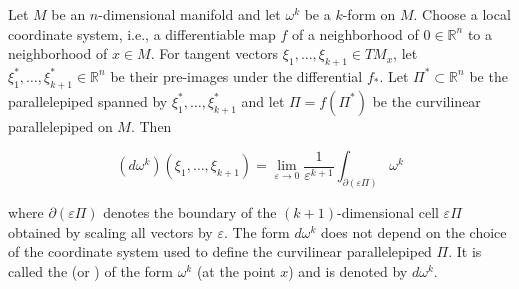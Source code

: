 Let $M$ be an $n$-dimensional manifold and let $\omega^k$ be a $k$-form on $M$. Choose a local coordinate system, i.e., a differentiable map $f$ of a neighborhood of $0 \in \mathbb{R}^n$ to a neighborhood of $x \in M$. For tangent vectors $\xi_1, \ldots, \xi_{k+1} \in TM_x$, let $\xi_1^*, \ldots, \xi_{k+1}^* \in \mathbb{R}^n$ be their pre-images under the differential $f_*$. Let $\Pi^* \subset \mathbb{R}^n$ be the parallelepiped spanned by $\xi_1^*, \ldots, \xi_{k+1}^*$ and let $\Pi = f(\Pi^*)$ be the curvilinear parallelepiped on $M$. Then

$$
(d\omega^k)(\xi_1, \ldots, \xi_{k+1}) = \lim_{\varepsilon \to 0} \frac{1}{\varepsilon^{k+1}} \int_{\partial(\varepsilon \Pi)} \omega^k
$$

where $\partial(\varepsilon \Pi)$ denotes the boundary of the $(k+1)$-dimensional cell $\varepsilon \Pi$ obtained by scaling all vectors by $\varepsilon$. The form $d\omega^k$ does not depend on the choice of the coordinate system used to define the curvilinear parallelepiped $\Pi$. It is called the  (or ) of the form $\omega^k$ (at the point $x$) and is denoted by $d\omega^k$.
